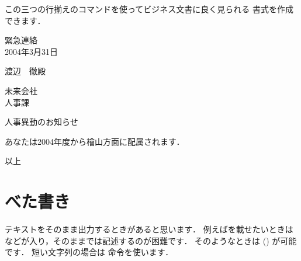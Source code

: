 この三つの行揃えのコマンドを使ってビジネス文書に良く見られる
書式を作成できます．

\begin{inout}
\begin{flushright} 
   緊急連絡 \\    2004年3月31日
\end{flushright}
\begin{flushleft} 
   渡辺　徹殿
\end{flushleft}
\begin{flushright} 
   未来会社\\    人事課
\end{flushright}
\begin{center}
   人事異動のお知らせ
\end{center}
あなたは2004年度から檜山方面に配属されます．
\begin{flushright}  以上  \end{flushright}
\end{inout}





\section{べた書き}
%
%
テキストをそのまま出力するときがあると思います．
例えばを載せたいときは
などが入り，そのままでは記述するのが困難です．
そのようなときは () が可能です．
短い文字列の場合は 命令を使います．

